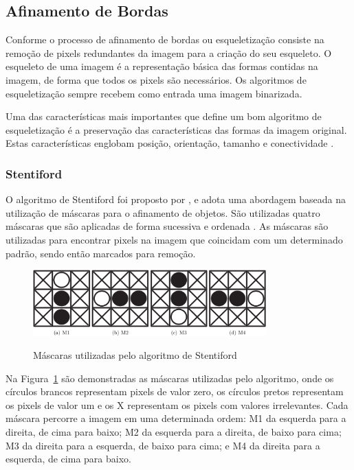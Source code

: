 \documentclass[12pt,oneside,a4paper,english,french,spanish,brazil,]{abntex2}
\begin{document}
\subsection{Afinamento de Bordas}

Conforme \citet{guilherme:2007} o processo de afinamento de bordas ou esqueletização consiste na remoção de pixels redundantes da imagem para a criação do seu esqueleto. O esqueleto de uma imagem é a representação básica das formas contidas na imagem, de forma que todos os pixels são necessários. Os algoritmos de esqueletização sempre recebem como entrada uma imagem binarizada.

Uma das características mais importantes que define um bom algoritmo de esqueletização é a preservação das características das formas da imagem original. Estas características englobam posição, orientação, tamanho e conectividade \cite{guilherme:2007}.

\subsubsection{Stentiford}

O algoritmo de Stentiford foi proposto por \citet{stentiford:1983}, e adota uma abordagem baseada na utilização de máscaras para o afinamento de objetos. São utilizadas quatro máscaras que são aplicadas de forma sucessiva e ordenada \cite{guilherme:2007}. As máscaras são utilizadas para encontrar pixels na imagem que coincidam com um determinado padrão, sendo então marcados para remoção.

\begin{figure}[ht]
\centering
\caption{Máscaras utilizadas pelo algoritmo de Stentiford}
\includegraphics[width=0.8\textwidth]{imagens/PDI_Stentiford_1.PNG}
\label{fig:PDI_Stentiford_1}
\end{figure}

Na Figura~\ref{fig:PDI_Stentiford_1} são demonstradas as máscaras utilizadas pelo algoritmo, onde os círculos brancos representam pixels de valor zero, os círculos pretos representam os pixels de valor um e os X representam os pixels com valores irrelevantes. Cada máscara percorre a imagem em uma determinada ordem: M1 da esquerda para a direita, de cima para baixo; M2 da esquerda para a direita, de baixo para cima; M3 da direita para a esquerda, de baixo para cima; e M4 da direita para a esquerda, de cima para baixo.
\end{document}
